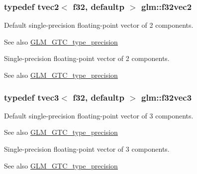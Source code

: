 \subsubsection[{f32vec2}]{\setlength{\rightskip}{0pt plus 5cm}typedef tvec2$<$ f32, defaultp $>$ {\bf glm\+::f32vec2}}\label{group__gtc__type__precision_ga8681dee3524dea86388178c49c27079a}
Default single-\/precision floating-\/point vector of 2 components. \begin{DoxySeeAlso}{See also}
\hyperlink{group__gtc__type__precision}{G\+L\+M\+\_\+\+G\+T\+C\+\_\+type\+\_\+precision}
\end{DoxySeeAlso}
Single-\/precision floating-\/point vector of 2 components. \begin{DoxySeeAlso}{See also}
\hyperlink{group__gtc__type__precision}{G\+L\+M\+\_\+\+G\+T\+C\+\_\+type\+\_\+precision} 
\end{DoxySeeAlso}
\hypertarget{group__gtc__type__precision_gab550330e62a7bc3fa9e6740b9421037c}{}
\subsubsection[{f32vec3}]{\setlength{\rightskip}{0pt plus 5cm}typedef tvec3$<$ f32, defaultp $>$ {\bf glm\+::f32vec3}}\label{group__gtc__type__precision_gab550330e62a7bc3fa9e6740b9421037c}
Default single-\/precision floating-\/point vector of 3 components. \begin{DoxySeeAlso}{See also}
\hyperlink{group__gtc__type__precision}{G\+L\+M\+\_\+\+G\+T\+C\+\_\+type\+\_\+precision}
\end{DoxySeeAlso}
Single-\/precision floating-\/point vector of 3 components. \begin{DoxySeeAlso}{See also}
\hyperlink{group__gtc__type__precision}{G\+L\+M\+\_\+\+G\+T\+C\+\_\+type\+\_\+precision} 
\end{DoxySeeAlso}
\hypertarget{group__gtc__type__precision_ga6848e3b5cb5c1f4c117717b309e726eb}{}
